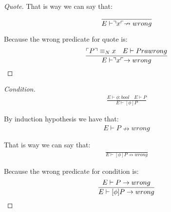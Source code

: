 \begin{theorem}
\begin{proof}[Quote]
That is way we can say that:
\begin{align*}
\frac{}{E \vdash \urcorner x \ulcorner \nrightarrow wrong}
\end{align*}

Because the wrong predicate for quote is:
\begin{align*}
\frac{\ulcorner P \urcorner \equiv _N x \quad E \vdash P ra wrong}{E \vdash \urcorner x \ulcorner \rightarrow wrong}
\end{align*}

\end{proof}

\begin{proof}[Condition]
\begin{align*}
\frac{E \vdash \phi : bool \quad E \vdash P}{E \vdash [\phi]P}
\end{align*}

By induction hypothesis we have that:
\begin{align*}
E \vdash P \nrightarrow wrong
\end{align*}

That is way we can say that:
\begin{align*}
\frac{}{E \vdash [\phi ]P \nrightarrow wrong}
\end{align*}

Because the wrong predicate for condition is:
\begin{align*}
\frac{E \vdash P \rightarrow wrong}{E \vdash [\phi ]P \rightarrow wrong}
\end{align*}
\end{proof}
\end{theorem}






